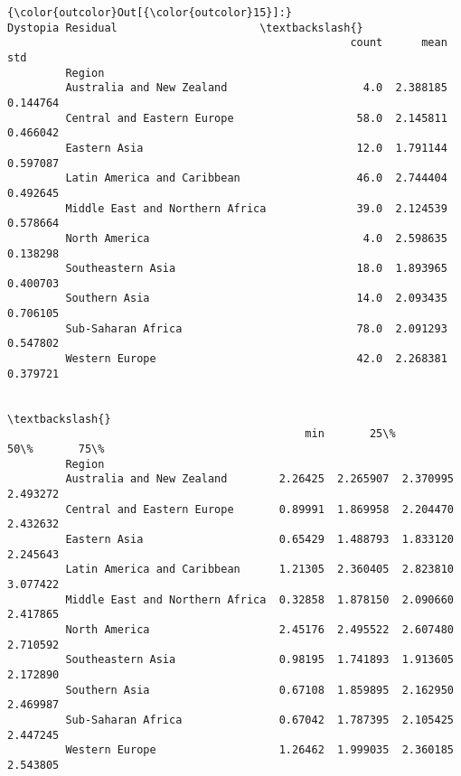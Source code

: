 \documentclass[11pt]{article}
\begin{document}
\begin{Verbatim}[commandchars=\\\{\}]
{\color{outcolor}Out[{\color{outcolor}15}]:}                                 Dystopia Residual                      \textbackslash{}
                                                     count      mean       std   
         Region                                                                  
         Australia and New Zealand                     4.0  2.388185  0.144764   
         Central and Eastern Europe                   58.0  2.145811  0.466042   
         Eastern Asia                                 12.0  1.791144  0.597087   
         Latin America and Caribbean                  46.0  2.744404  0.492645   
         Middle East and Northern Africa              39.0  2.124539  0.578664   
         North America                                 4.0  2.598635  0.138298   
         Southeastern Asia                            18.0  1.893965  0.400703   
         Southern Asia                                14.0  2.093435  0.706105   
         Sub-Saharan Africa                           78.0  2.091293  0.547802   
         Western Europe                               42.0  2.268381  0.379721   
         
                                                                                 \textbackslash{}
                                              min       25\%       50\%       75\%   
         Region                                                                   
         Australia and New Zealand        2.26425  2.265907  2.370995  2.493272   
         Central and Eastern Europe       0.89991  1.869958  2.204470  2.432632   
         Eastern Asia                     0.65429  1.488793  1.833120  2.245643   
         Latin America and Caribbean      1.21305  2.360405  2.823810  3.077422   
         Middle East and Northern Africa  0.32858  1.878150  2.090660  2.417865   
         North America                    2.45176  2.495522  2.607480  2.710592   
         Southeastern Asia                0.98195  1.741893  1.913605  2.172890   
         Southern Asia                    0.67108  1.859895  2.162950  2.469987   
         Sub-Saharan Africa               0.67042  1.787395  2.105425  2.447245   
         Western Europe                   1.26462  1.999035  2.360185  2.543805   
         

\end{Verbatim}
\end{document}
